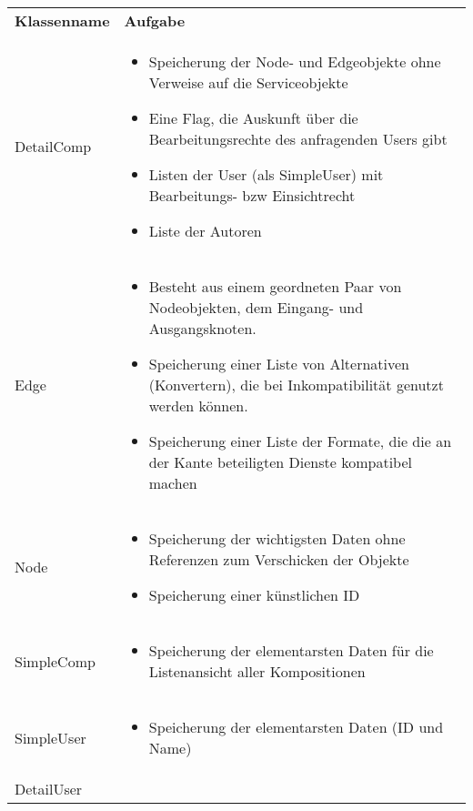 \begin{table}
	\begin{tabularx}{\textwidth}{p{} | X}
		\rowcolor[HTML]{C0C0C0}
		\textbf{Klassenname} & \textbf{Aufgabe} \\
		\rowcolor[HTML]{E7E7E7}
		DetailComp & \compress \begin{itemize}
			\item Speicherung der Node- und Edgeobjekte ohne Verweise auf die Serviceobjekte
			\item Eine Flag, die Auskunft über die Bearbeitungsrechte des anfragenden Users gibt
			\item Listen der User (als SimpleUser) mit Bearbeitungs- bzw Einsichtrecht
			\item Liste der Autoren
		\end{itemize}\\
		\rowcolor[HTML]{E7E7E7}
		Edge & \compress \begin{itemize}
		  \item Besteht aus einem geordneten Paar von Nodeobjekten, dem Eingang- und Ausgangsknoten.
			\item Speicherung einer Liste von Alternativen (Konvertern), die bei Inkompatibilität genutzt werden können.
			\item Speicherung einer Liste der Formate, die die an der Kante beteiligten Dienste kompatibel machen
		\end{itemize}\\
		Node & \compress \begin{itemize}
			\item Speicherung der wichtigsten Daten ohne Referenzen zum Verschicken der Objekte
			\item Speicherung einer künstlichen ID
		\end{itemize}\\
		\rowcolor[HTML]{E7E7E7}
		SimpleComp & \compress \begin{itemize}
			\item Speicherung der elementarsten Daten für die Listenansicht aller Kompositionen
		\end{itemize}\\
		SimpleUser  & \compress \begin{itemize}
			\item Speicherung der elementarsten Daten (ID und Name)
		\end{itemize}\\
		\rowcolor[HTML]{E7E7E7}
		DetailUser & \compress \begin{itemize}

\end{itemize}
\end{tabularx}
\end{table}
